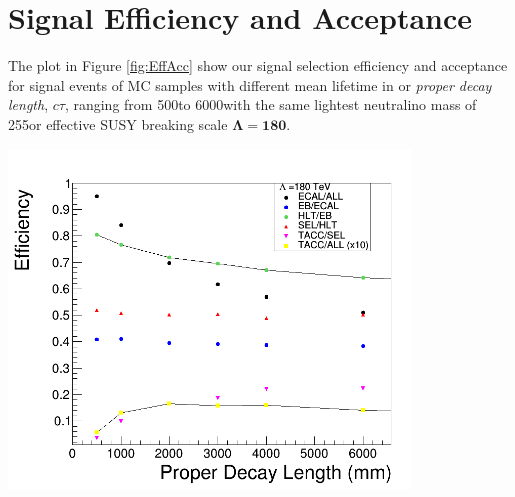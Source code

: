 \section{Signal Efficiency and Acceptance}
The plot in Figure \ref{fig:EffAcc} show our signal selection efficiency and acceptance for signal events of MC samples with different mean lifetime in \mm or \textit{proper decay length}, $c\tau$, ranging from 500\mm to 6000\mm with the same lightest neutralino mass of 255\GeVcc or effective SUSY breaking scale $\mathbf{\Lambda=180}$\TeV. 

\vspace{5mm}
\begin{minipage}{0.90\linewidth} 
\begin{center}
\includegraphics[height=0.65\textwidth, width=0.8\textwidth]{THESISPLOTS/Eff_180_ctau_2015.png}
\label{fig:EffAcc}
\end{center}
\end{minipage}

